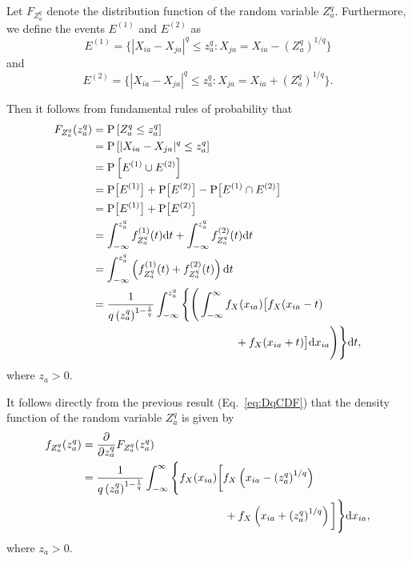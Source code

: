 \documentclass[aoas]{imsart}
\begin{document}
Let $F_{Z^q_a}$ denote the distribution function of the random variable $Z^q_a$. Furthermore, we define the events $E^{(1)}$ and $E^{(2)}$ as
%
\begin{equation}\label{eq:E(1)}
E^{(1)} = \bigl\{|X_{ia}-X_{ja}|^q \leq z^q_a : X_{ja} = X_{ia} - \left(Z^q_a\right)^{1/q}\bigr\}
\end{equation}
%
and
%
\begin{equation}\label{eq:E(2)}
E^{(2)} = \bigl\{|X_{ia}-X_{ja}|^q \leq z^q_a : X_{ja} = X_{ia} + \left(Z^q_a\right)^{1/q}\bigr\}.
\end{equation}

Then it follows from fundamental rules of probability that
%
\begin{equation}\label{eq:DqCDF}
\begin{aligned}
F_{Z^q_a}(z^q_a) &= \text{P}\left[Z^q_a \leq z^q_a\right] \\
&= \text{P}\left[|X_{ia} - X_{ja}|^q \leq z^q_a\right] \\
&= \text{P}\left[E^{(1)} \cup E^{(2)}\right] \\
&= \text{P}\bigl[E^{(1)}\bigr] + \text{P}\bigl[E^{(2)}\bigr] - \text{P}\bigl[E^{(1)} \cap E^{(2)}\bigr] \\
&= \text{P}\bigl[E^{(1)}\bigr] + \text{P}\bigl[E^{(2)}\bigr] \\
&= \int_{-\infty}^{z^q_a} f^{(1)}_{Z^q_a}(t) \text{d}t + \int_{-\infty}^{z^q_a} f^{(2)}_{Z^q_a}(t) \text{d}t \\
&= \int_{-\infty}^{z^q_a} \left(f^{(1)}_{Z^q_a}(t) + f^{(2)}_{Z^q_a}(t)\right) \text{d}t \\
&= \frac{1}{q \left(z^q_a\right)^{1 - \frac{1}{q}}} \int_{-\infty}^{z^q_a} {\Biggl \{}{\Biggl(}\int_{-\infty}^{\infty}f_X(x_{ia}){\bigl[}f_X(x_{ia} - t) \\
&\hspace{4.5cm}+ f_X(x_{ia} + t){\bigr]} \text{d}x_{ia}{\Biggr)}{\Biggr\}}\text{d}t,
\end{aligned}
\end{equation}
%
where $z_a > 0$.

It follows directly from the previous result (Eq.~\ref{eq:DqCDF}) that the density function of the random variable $Z^q_a$ is given by
%
\begin{equation}\label{eq:DqPDF}
\begin{aligned}
f_{Z^q_a}(z^q_a) &= \frac{\partial}{\partial z^q_a} F_{Z^q_a}(z^q_a) \\
&= \frac{1}{q \left(z^q_a\right)^{1 - \frac{1}{q}}}\int_{-\infty}^{\infty} {\Biggl\{}f_X(x_{ia}){\biggl[}f_X\left(x_{ia} - \left(z^q_a\right)^{1/q}\right) \\
&\hspace{4.5cm}+ f_X\left(x_{ia} + \left(z^q_a\right)^{1/q}\right){\biggr]}{\Biggr\}} \text{d}x_{ia},
\end{aligned}
\end{equation}
%
where $z_a > 0$.
\end{document}
